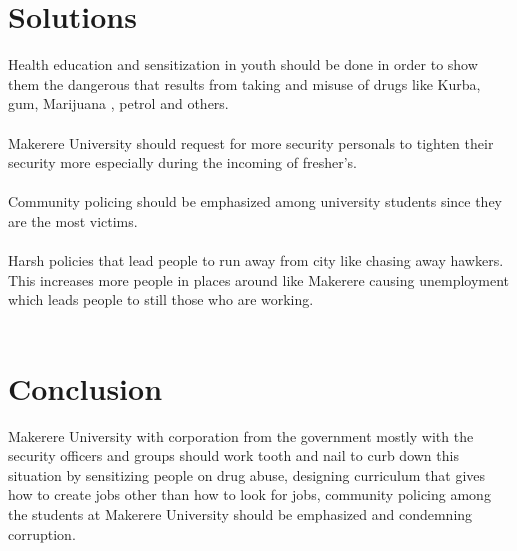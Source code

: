 \documentclass{report}
\begin{document}
\section{Solutions}
Health education and sensitization in youth should be done in order to show them the dangerous that results from taking and misuse of drugs like Kurba, gum, Marijuana , petrol and others.
\\\\
Makerere University should request for more security personals to tighten their security more especially during the incoming of fresher’s.
\\\\
Community policing should be emphasized among university students since they are the most victims.
\\\\
Harsh policies that lead people to run away from city like chasing away hawkers. This increases more people in places around like Makerere causing unemployment which leads people to still those who are working.
\\\\

\section{Conclusion}
Makerere University with corporation from the government mostly with the security officers and groups should work tooth and nail to curb down this situation by sensitizing people on drug abuse, designing curriculum that gives how to create jobs other than how to look for jobs, community policing among the students at Makerere University should be emphasized and condemning corruption.
\end{document}

